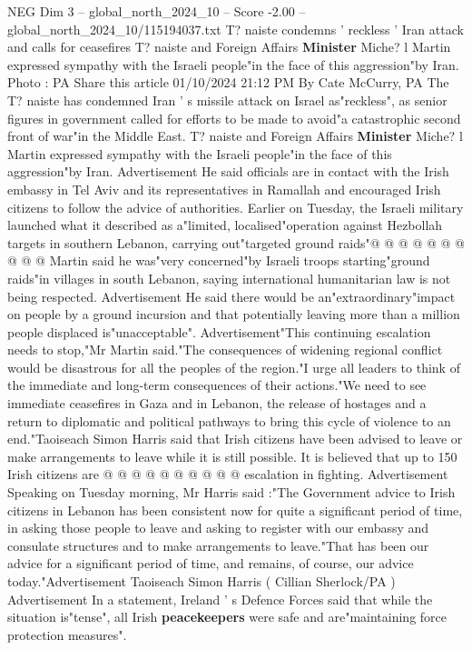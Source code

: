 \begin{textsample}{NEG Dim 3 – global\_north\_2024\_10 – Score -2.00 – global\_north\_2024\_10/115194037.txt}  \label{ex:f3_neg_331}
T? naiste condemns ' reckless ' Iran attack and calls for ceasefires T? naiste and Foreign Affairs \textbf{Minister} Miche? l Martin expressed sympathy with the Israeli people"in the face of this aggression"by Iran.
Photo : PA Share this article 01/10/2024 21:12 PM By Cate McCurry, PA The T? naiste has condemned Iran ' s missile attack on Israel as"reckless", as senior figures in government called for efforts to be made to avoid"a catastrophic second front of war"in the Middle East.
T? naiste and Foreign Affairs \textbf{Minister} Miche? l Martin expressed sympathy with the Israeli people"in the face of this aggression"by Iran.
Advertisement He said officials are in contact with the Irish embassy in Tel Aviv and its representatives in Ramallah and encouraged Irish citizens to follow the advice of authorities.
Earlier on Tuesday, the Israeli military launched what it described as a"limited, localised"operation against Hezbollah targets in southern Lebanon, carrying out"targeted ground raids"@ @ @ @ @ @ @ @ @ @ Martin said he was"very concerned"by Israeli troops starting"ground raids"in villages in south Lebanon, saying international humanitarian law is not being respected.
Advertisement He said there would be an"extraordinary"impact on people by a ground incursion and that potentially leaving more than a million people displaced is"unacceptable".
Advertisement"This continuing escalation needs to stop,"Mr Martin said."The consequences of widening regional conflict would be disastrous for all the peoples of the region."I urge all leaders to think of the immediate and long-term consequences of their actions."We need to see immediate ceasefires in Gaza and in Lebanon, the release of hostages and a return to diplomatic and political pathways to bring this cycle of violence to an end."Taoiseach Simon Harris said that Irish citizens have been advised to leave or make arrangements to leave while it is still possible.
It is believed that up to 150 Irish citizens are @ @ @ @ @ @ @ @ @ @ escalation in fighting.
Advertisement Speaking on Tuesday morning, Mr Harris said :"The Government advice to Irish citizens in Lebanon has been consistent now for quite a significant period of time, in asking those people to leave and asking to register with our embassy and consulate structures and to make arrangements to leave."That has been our advice for a significant period of time, and remains, of course, our advice today."Advertisement Taoiseach Simon Harris ( Cillian Sherlock/PA ) Advertisement In a statement, Ireland ' s Defence Forces said that while the situation is"tense", all Irish \textbf{peacekeepers} were safe and are"maintaining force protection measures".

\end{textsample}
